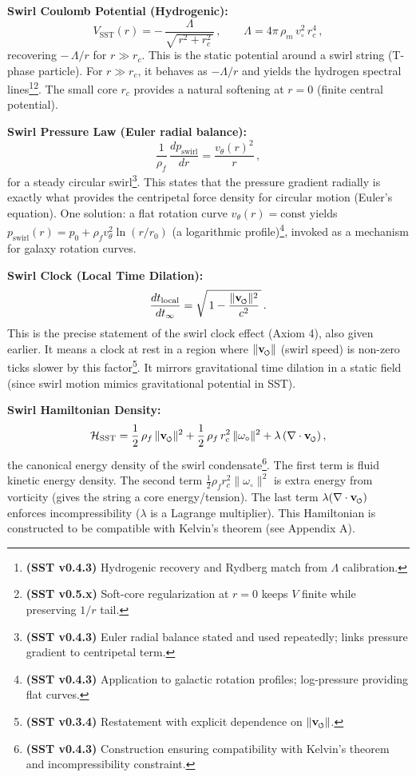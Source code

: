 \documentclass[reprint,aps,onecolumn,nofootinbib]{revtex4-2}
\newcommand{\swirlarrow}{%
    \mathchoice{\mkern-2mu\scriptstyle\boldsymbol{\circlearrowleft}}%
    {\mkern-2mu\scriptstyle\boldsymbol{\circlearrowleft}}%
    {\mkern-2mu\scriptscriptstyle\boldsymbol{\circlearrowleft}}%
    {\mkern-2mu\scriptscriptstyle\boldsymbol{\circlearrowleft}}%
}
\newcommand{\vswirl}{\mathbf{v}_{\swirlarrow}}
\begin{document}
    \begin{tcolorbox}[title=Master Equations of SST (\canonversion)]
    \textbf{Swirl Coulomb Potential (Hydrogenic):}
    \[
        V_{\text{SST}}(r) = -\,\frac{\Lambda}{\sqrt{\,r^2 + r_c^2\,}}\,, \qquad \Lambda = 4\pi\,\rho_m\,v_{\circ}^2\,r_c^4\,,
    \]
    recovering $-\,\Lambda/r$ for $r \gg r_c$. This is the static potential around a swirl string (T-phase particle). For $r \gg r_c$, it behaves as $-\Lambda/r$ and yields the hydrogen spectral lines\footnote{\textbf{(SST v0.4.3)} Hydrogenic recovery and Rydberg match from $\Lambda$ calibration.}\footnote{\textbf{(SST v0.5.x)} Soft-core regularization at $r=0$ keeps $V$ finite while preserving $1/r$ tail.}. The small core $r_c$ provides a natural softening at $r=0$ (finite central potential).

    \textbf{Swirl Pressure Law (Euler radial balance):}
    \[
        \frac{1}{\rho_f}\,\frac{d p_{\text{swirl}}}{dr} = \frac{v_{\theta}(r)^2}{r}\,,
    \]
    for a steady circular swirl\footnote{\textbf{(SST v0.4.3)} Euler radial balance stated and used repeatedly; links pressure gradient to centripetal term.}. This states that the pressure gradient radially is exactly what provides the centripetal force density for circular motion (Euler’s equation). One solution: a flat rotation curve $v_{\theta}(r)=\text{const}$ yields $p_{\text{swirl}}(r) = p_0 + \rho_f v_{\theta}^2 \ln(r/r_0)$ (a logarithmic profile)\footnote{\textbf{(SST v0.4.3)} Application to galactic rotation profiles; log-pressure providing flat curves.}, invoked as a mechanism for galaxy rotation curves.

    \textbf{Swirl Clock (Local Time Dilation):}
    \[
        \frac{dt_{\text{local}}}{dt_{\infty}} = \sqrt{\,1 - \frac{\|\vswirl\|^2}{c^2}\,}\,.
    \]
    This is the precise statement of the swirl clock effect (Axiom 4), also given earlier. It means a clock at rest in a region where $\|\vswirl\|$ (swirl speed) is non-zero ticks slower by this factor\footnote{\textbf{(SST v0.3.4)} Restatement with explicit dependence on $\|\vswirl\|$.}. It mirrors gravitational time dilation in a static field (since swirl motion mimics gravitational potential in SST).

    \textbf{Swirl Hamiltonian Density:}
    \[
        \mathcal{H}_{\text{SST}} = \frac{1}{2}\,\rho_f\,\|\vswirl\|^2 + \frac{1}{2}\,\rho_f\,r_c^2\,\|\omega_{\circ}\|^2 + \lambda\,(\nabla \cdot \vswirl)\,,
    \]
    the canonical energy density of the swirl condensate\footnote{\textbf{(SST v0.4.3)} Construction ensuring compatibility with Kelvin’s theorem and incompressibility constraint.}. The first term is fluid kinetic energy density. The second term $\frac{1}{2}\rho_f r_c^2 \|\omega_{\circ}\|^2$ is extra energy from vorticity (gives the string a core energy/tension). The last term $\lambda(\nabla\cdot\vswirl)$ enforces incompressibility ($\lambda$ is a Lagrange multiplier). This Hamiltonian is constructed to be compatible with Kelvin’s theorem (see Appendix A).


\end{tcolorbox}
\end{document}
